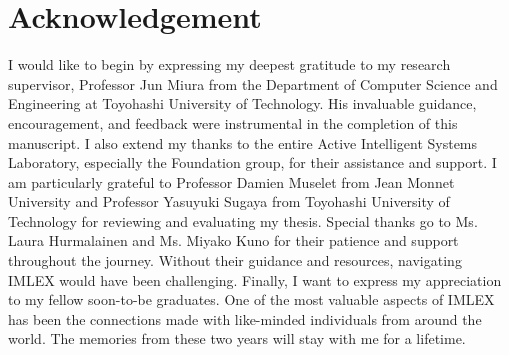\chapter{Acknowledgement}
I would like to begin by expressing my deepest gratitude to my research supervisor, Professor Jun Miura from the Department of Computer Science and Engineering at Toyohashi University of Technology. His invaluable guidance, encouragement, and feedback were instrumental in the completion of this manuscript. I also extend my thanks to the entire Active Intelligent Systems Laboratory, especially the Foundation group, for their assistance and support. I am particularly grateful to Professor Damien Muselet from Jean Monnet University and Professor Yasuyuki Sugaya from Toyohashi University of Technology for reviewing and evaluating my thesis. Special thanks go to Ms. Laura Hurmalainen and Ms. Miyako Kuno for their patience and support throughout the journey. Without their guidance and resources, navigating IMLEX would have been challenging. Finally, I want to express my appreciation to my fellow soon-to-be graduates. One of the most valuable aspects of IMLEX has been the connections made with like-minded individuals from around the world. The memories from these two years will stay with me for a lifetime.